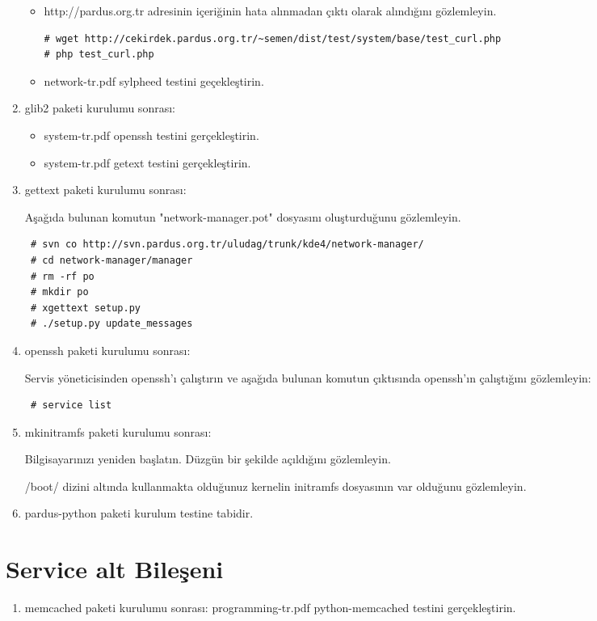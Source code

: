 \documentclass[a4paper,10pt]{article}
\begin{document}
\begin{enumerate}
\begin{itemize}
\item http://pardus.org.tr adresinin içeriğinin hata alınmadan çıktı olarak alındığını gözlemleyin.
\begin{verbatim}
# wget http://cekirdek.pardus.org.tr/~semen/dist/test/system/base/test_curl.php
# php test_curl.php
\end{verbatim}

\item network-tr.pdf sylpheed testini geçekleştirin.
\end{itemize}

\item glib2 paketi kurulumu sonrası:
\begin{itemize}
 \item system-tr.pdf openssh testini gerçekleştirin.
\item system-tr.pdf getext testini gerçekleştirin.
\end{itemize}

\item gettext paketi kurulumu sonrası:

Aşağıda bulunan komutun "network-manager.pot" dosyasını oluşturduğunu gözlemleyin.
\begin{verbatim}
 # svn co http://svn.pardus.org.tr/uludag/trunk/kde4/network-manager/
 # cd network-manager/manager
 # rm -rf po
 # mkdir po
 # xgettext setup.py 
 # ./setup.py update_messages
\end{verbatim}


\item openssh paketi kurulumu sonrası:

Servis yöneticisinden openssh'ı çalıştırın ve aşağıda bulunan komutun çıktısında openssh'ın çalıştığını gözlemleyin:
\begin{verbatim}
 # service list 
\end{verbatim}

\item mkinitramfs paketi kurulumu sonrası:

Bilgisayarınızı yeniden başlatın. Düzgün bir şekilde açıldığını gözlemleyin.

/boot/ dizini altında kullanmakta olduğunuz kernelin initramfs dosyasının var olduğunu gözlemleyin.

\item pardus-python paketi kurulum testine tabidir.

\end{enumerate}
\section{Service alt Bileşeni}
\begin{enumerate}
 \item memcached paketi kurulumu sonrası:
  programming-tr.pdf python-memcached testini gerçekleştirin. 
\end{enumerate}
\end{document}
